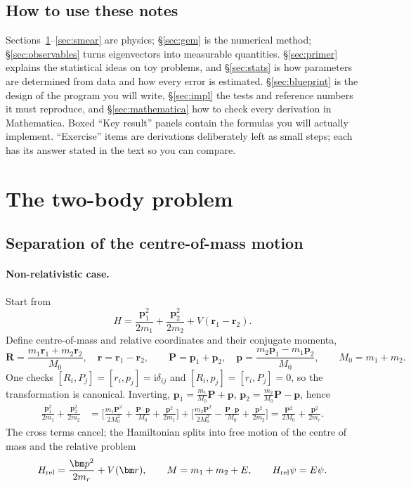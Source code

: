 \documentclass[11pt,a4paper]{article}
\numberwithin{equation}{section}
\theoremstyle{definition}
\theoremstyle{plain}
\theoremstyle{remark}
\numberwithin{algorithm}{section}
\newcommand{\vr}{\bm r}
\newcommand{\vR}{\bm R}
\newcommand{\vp}{\bm p}
\newcommand{\vP}{\bm P}
\newcommand{\ii}{\mathrm{i}}
\newcommand{\mr}{m_r}
\begin{document}
\subsection{How to use these notes}
Sections~\ref{sec:twobody}--\ref{sec:smear} are physics; \S\ref{sec:gem} is the numerical method; \S\ref{sec:observables} turns eigenvectors into measurable quantities. \S\ref{sec:primer} explains the statistical ideas on toy problems, and \S\ref{sec:stats} is how parameters are determined from data and how every error is estimated. \S\ref{sec:blueprint} is the design of the program you will write, \S\ref{sec:impl} the tests and reference numbers it must reproduce, and \S\ref{sec:mathematica} how to check every derivation in Mathematica.
Boxed ``Key result'' panels contain the formulas you will actually implement. ``Exercise'' items are derivations deliberately left as small steps; each has its answer stated in the text so you can compare.
\section{The two-body problem}\label{sec:twobody}

\subsection{Separation of the centre-of-mass motion}\label{sec:cm}
\paragraph{Non-relativistic case.} Start from
\begin{equation}
H=\frac{\vp_1^2}{2m_1}+\frac{\vp_2^2}{2m_2}+V(\vr_1-\vr_2).
\end{equation}
Define centre-of-mass and relative coordinates and their conjugate momenta,
\begin{equation}
\vR=\frac{m_1\vr_1+m_2\vr_2}{M_0},\quad \vr=\vr_1-\vr_2,\qquad
\vP=\vp_1+\vp_2,\quad \vp=\frac{m_2\vp_1-m_1\vp_2}{M_0},\qquad M_0=m_1+m_2 .
\end{equation}
One checks $[R_i,P_j]=[r_i,p_j]=\ii\delta_{ij}$ and $[R_i,p_j]=[r_i,P_j]=0$, so the transformation is canonical. Inverting,
$\vp_1=\frac{m_1}{M_0}\vP+\vp$, $\vp_2=\frac{m_2}{M_0}\vP-\vp$, hence
\begin{align}
\frac{\vp_1^2}{2m_1}+\frac{\vp_2^2}{2m_2}
&=\Big[\frac{m_1\vP^2}{2M_0^2}+\frac{\vP\!\cdot\!\vp}{M_0}+\frac{\vp^2}{2m_1}\Big]
+\Big[\frac{m_2\vP^2}{2M_0^2}-\frac{\vP\!\cdot\!\vp}{M_0}+\frac{\vp^2}{2m_2}\Big]
=\frac{\vP^2}{2M_0}+\frac{\vp^2}{2\mr}.
\end{align}
The cross terms cancel; the Hamiltonian splits into free motion of the centre of mass and the relative problem
\begin{equation}
H_{\rm rel}=\frac{\vp^2}{2\mr}+V(\vr),\qquad M=m_1+m_2+E,\qquad H_{\rm rel}\psi=E\psi .
\end{equation}
\end{document}
